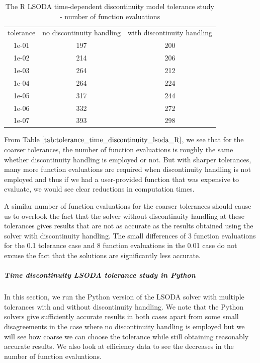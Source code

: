 \begin{table}[H]
\caption {The R LSODA time-dependent discontinuity model tolerance study - number of function evaluations} \label{tab:tolerance_time_discontinuity_lsoda_R} 
\begin{center}
\begin{tabular}{ c c c }
tolerance & no discontinuity handling & with discontinuity handling \\ 
1e-01 & 197 & 200 \\
1e-02 & 214 & 206 \\
1e-03 & 264 & 212 \\
1e-04 & 264 & 224 \\
1e-05 & 317 & 244 \\
1e-06 & 332 & 272 \\
1e-07 & 393 & 298 \\
\end{tabular}
\end{center}
\end{table}

From Table $\ref{tab:tolerance_time_discontinuity_lsoda_R}$, we see that for the coarser tolerances, the number of function evaluations is roughly the same whether discontinuity handling is employed or not. But with sharper tolerances, many more function evaluations are required when discontinuity handling is not employed and thus if we had a user-provided function that was expensive to evaluate, we would see clear reductions in computation times.

A similar number of function evaluations for the coarser tolerances should cause us to overlook the fact that the solver without discontinuity handling at these tolerances gives results that are not as accurate as the results obtained using the solver with discontinuity handling. The small differences of 3 function evaluations for the 0.1 tolerance case and 8 function evaluations in the 0.01 case do not excuse the fact that the solutions are significantly less accurate.

\subparagraph{Time discontinuity LSODA tolerance study in Python}
In this section, we run the Python version of the LSODA solver with multiple tolerances with and without discontinuity handling. We note that the Python solvers give sufficiently accurate results in both cases apart from some small disagreements in the case where no discontinuity handling is employed but we will see how coarse we can choose the tolerance while still obtaining reasonably accurate results. We also look at efficiency data to see the decreases in the number of function evaluations.


